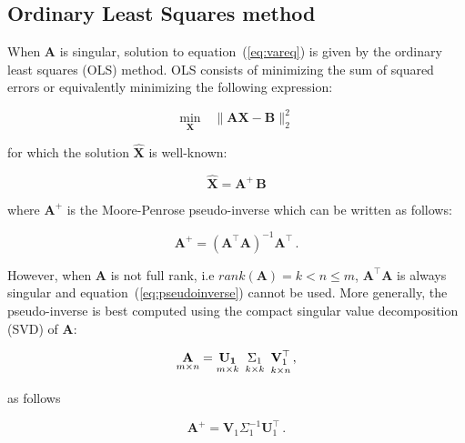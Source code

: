 \subsection{Ordinary Least Squares method}

When $\mathbf{A}$ is singular, solution to equation~(\ref{eq:vareq}) is given
by the ordinary least squares (OLS) method. OLS consists of minimizing the sum
of squared errors or equivalently minimizing the following expression:

\begin{equation*}
\label{eq:regressionproblem}
\underset{\mathbf{X}}{\text{min}} \quad \| \mathbf{A}\mathbf{\mathbf{X}} - \mathbf{B} \|_2^2
\end{equation*}

\noindent for which the solution $\hat{\mathbf{X}}$ is well-known:

\begin{equation*}
\label{eq:MP}
\hat{\mathbf{X}}=\mathbf{A}^{\!\!+}\,\mathbf{B}
\end{equation*}

\noindent where $\mathbf{A}^{\!\!+}$ is the Moore-Penrose pseudo-inverse
which can be written as follows: 

\begin{equation}
\label{eq:pseudoinverse}
\mathbf{A}^{\!\!+}= (\mathbf{A}^{\!\!\top} \mathbf{A})^{-1}\mathbf{A}^{\!\!\top} \, .
\end{equation}

However, when $\mathbf{A}$ is not full rank, i.e
$rank(\mathbf{A})=k <  n \leq m$, $\mathbf{A}^\top \mathbf{A}$ is
always singular and equation~(\ref{eq:pseudoinverse}) cannot be used.
More generally, the pseudo-inverse is best computed using the compact
singular value decomposition (SVD) of $\mathbf{A}$:

\begin{equation*}
    \label{eq:compactsvd}
    \underset{m \times n}{\mathbf{A}}=
    \underset{m \times k}{\mathbf{U_1}} \enskip
    \underset{k \times k}{\Sigma_1} \enskip
    \underset{k \times n}{\mathbf{V}_1^{\top}} \, ,
\end{equation*}

\noindent as follows

\begin{equation*}
\label{eq:pseudoinversesvd}
\mathbf{A}^{\!\!+} = \mathbf{V}_1 \Sigma_1^{-1} \mathbf{U}_1^\top \, .
\end{equation*}


